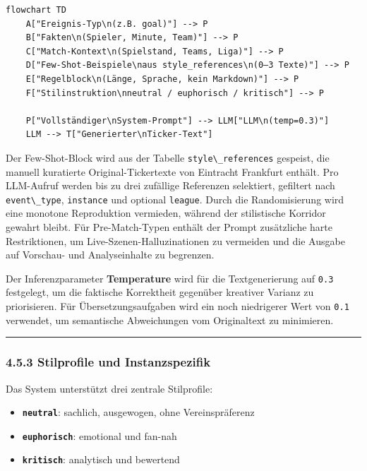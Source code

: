 \begin{lstlisting}
flowchart TD
    A["Ereignis-Typ\n(z.B. goal)"] --> P
    B["Fakten\n(Spieler, Minute, Team)"] --> P
    C["Match-Kontext\n(Spielstand, Teams, Liga)"] --> P
    D["Few-Shot-Beispiele\naus style_references\n(0–3 Texte)"] --> P
    E["Regelblock\n(Länge, Sprache, kein Markdown)"] --> P
    F["Stilinstruktion\nneutral / euphorisch / kritisch"] --> P

    P["Vollständiger\nSystem-Prompt"] --> LLM["LLM\n(temp=0.3)"]
    LLM --> T["Generierter\nTicker-Text"]
\end{lstlisting}

Der Few-Shot-Block wird aus der Tabelle
\passthrough{\lstinline!style\_references!} gespeist, die manuell
kuratierte Original-Tickertexte von Eintracht Frankfurt enthält. Pro
LLM-Aufruf werden bis zu drei zufällige Referenzen selektiert, gefiltert
nach \passthrough{\lstinline!event\_type!},
\passthrough{\lstinline!instance!} und optional
\passthrough{\lstinline!league!}. Durch die Randomisierung wird eine
monotone Reproduktion vermieden, während der stilistische Korridor
gewahrt bleibt. Für Pre-Match-Typen enthält der Prompt zusätzliche harte
Restriktionen, um Live-Szenen-Halluzinationen zu vermeiden und die
Ausgabe auf Vorschau- und Analyseinhalte zu begrenzen.

Der Inferenzparameter \textbf{Temperature} wird für die Textgenerierung
auf \passthrough{\lstinline!0.3!} festgelegt, um die faktische
Korrektheit gegenüber kreativer Varianz zu priorisieren. Für
Übersetzungsaufgaben wird ein noch niedrigerer Wert von
\passthrough{\lstinline!0.1!} verwendet, um semantische Abweichungen vom
Originaltext zu minimieren.

\begin{center}\rule{0.5\linewidth}{0.5pt}\end{center}

\subsubsection{4.5.3 Stilprofile und
Instanzspezifik}\label{stilprofile-und-instanzspezifik}

Das System unterstützt drei zentrale Stilprofile:

\begin{itemize}
\tightlist
\item
  \textbf{\passthrough{\lstinline!neutral!}}: sachlich, ausgewogen, ohne
  Vereinspräferenz
\item
  \textbf{\passthrough{\lstinline!euphorisch!}}: emotional und fan-nah
\item
  \textbf{\passthrough{\lstinline!kritisch!}}: analytisch und bewertend
\end{itemize}

